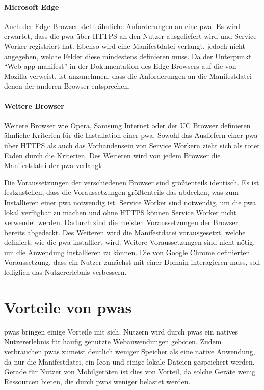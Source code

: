 \documentclass[12pt, parskip=half]{scrartcl}       %
\begin{document}
\paragraph{Microsoft Edge}
Auch der Edge Browser stellt ähnliche Anforderungen an eine \ac{pwa}.
Es wird erwartet, dass die \ac{pwa} über HTTPS an den Nutzer ausgeliefert wird und Service Worker registriert hat.
Ebenso wird eine Manifestdatei verlangt, jedoch nicht angegeben, welche Felder diese mindestens definieren muss.
Da der Unterpunkt \enquote{Web app manifest} in der Dokumentation des Edge Browsers auf die von Mozilla verweist, ist anzunehmen, dass die Anforderungen an die Manifestdatei denen der anderen Browser entsprechen.

\paragraph{Weitere Browser}
Weitere Browser wie Opera\cite{devopera_pwainstallcriteria}, Samsung Internet\cite{samsung_pwainstallcriteria} oder der UC Browser\cite{ucweb_pwainstallcriteria} definieren ähnliche Kriterien für die Installation einer \ac{pwa}.
Sowohl das Ausliefern einer \ac{pwa} über HTTPS als auch das Vorhandensein von Service Workern zieht sich als roter Faden durch die Kriterien.
Des Weiteren wird von jedem Browser die Manifestdatei der \ac{pwa} verlangt.

Die Voraussetzungen der verschiedenen Browser sind größtenteils identisch.
Es ist festzustellen, dass die Voraussetzungen größtenteils das abdecken, was zum Installieren einer \ac{pwa} notwendig ist.
Service Worker sind notwendig, um die \ac{pwa} lokal verfügbar zu machen und ohne HTTPS können Service Worker nicht verwendet werden.
Dadurch sind die meisten Voraussetzungen der Browser bereits abgedeckt.
Des Weiteren wird die Manifestdatei vorausgesetzt, welche definiert, wie die \ac{pwa} installiert wird.
Weitere Voraussetzungen sind nicht nötig, um die Anwendung installieren zu können.
Die von Google Chrome definierten Voraussetzung, dass ein Nutzer zunächst mit einer Domain interagieren muss, soll lediglich das Nutzererlebnis verbessern.

\newpage

\section{Vorteile von \aclp{pwa}}
\label{sec:vorteile}

\acp{pwa} bringen einige Vorteile mit sich.
Nutzern wird durch \acp{pwa} ein natives Nutzererlebnis für häufig genutzte Webanwendungen geboten.
Zudem verbrauchen \acp{pwa} zumeist deutlich weniger Speicher als eine native Anwendung, da nur die Manifestdatei, ein Icon und einige lokale Dateien gespeichert werden.
Gerade für Nutzer von Mobilgeräten ist dies von Vorteil, da solche Geräte wenig Ressourcen bieten, die durch \acp{pwa} weniger belastet werden.
\end{document}
